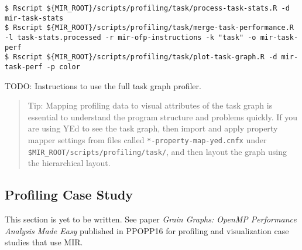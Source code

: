 \documentclass[11pt,a4paper]{article}
\begin{document}
\begin{lstlisting}[style=MyInputStyle]
$ Rscript ${MIR_ROOT}/scripts/profiling/task/process-task-stats.R -d mir-task-stats
$ Rscript ${MIR_ROOT}/scripts/profiling/task/merge-task-performance.R -l task-stats.processed -r mir-ofp-instructions -k "task" -o mir-task-perf
$ Rscript ${MIR_ROOT}/scripts/profiling/task/plot-task-graph.R -d mir-task-perf -p color
\end{lstlisting}

TODO: Instructions to use the full task graph profiler.

\begin{framed}
\begin{quote}
Tip: Mapping profiling data to visual attributes of the task graph is essential to understand the program structure and problems quickly. If you are using YEd to see the task graph, then import and apply property mapper settings from files called \texttt{*-property-map-yed.cnfx} under \texttt{\$MIR\_ROOT/scripts/profiling/task/}, and then layout the graph using the hierarchical layout.
\end{quote}
\end{framed}

\subsection{Profiling Case Study}

This section is yet to be written. See paper \textit{Grain Graphs: OpenMP Performance Analysis Made Easy} published in PPOPP16 for profiling and visualization case studies that use MIR.
\end{document}

